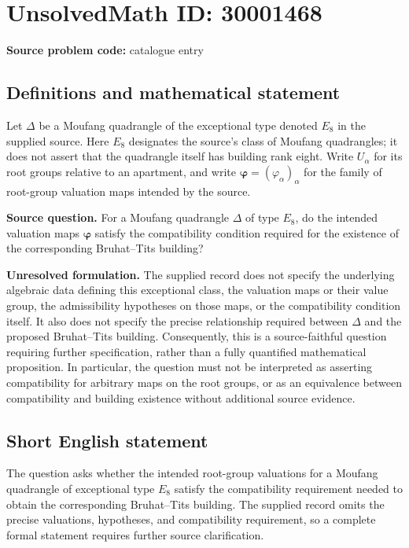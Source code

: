 \documentclass[11pt]{article}
\begin{document}
\section*{UnsolvedMath ID: 30001468}
\textbf{Source problem code:} catalogue entry
\subsection{Definitions and mathematical statement}
Let \(\Delta\) be a Moufang quadrangle of the exceptional type denoted \(E_8\) in the supplied source. Here \(E_8\) designates the source's class of Moufang quadrangles; it does not assert that the quadrangle itself has building rank eight. Write \(U_\alpha\) for its root groups relative to an apartment, and write \(\boldsymbol\varphi=(\varphi_\alpha)_\alpha\) for the family of root-group valuation maps intended by the source.

\textbf{Source question.} For a Moufang quadrangle \(\Delta\) of type \(E_8\), do the intended valuation maps \(\boldsymbol\varphi\) satisfy the compatibility condition required for the existence of the corresponding Bruhat--Tits building?

\textbf{Unresolved formulation.} The supplied record does not specify the underlying algebraic data defining this exceptional class, the valuation maps or their value group, the admissibility hypotheses on those maps, or the compatibility condition itself. It also does not specify the precise relationship required between \(\Delta\) and the proposed Bruhat--Tits building. Consequently, this is a source-faithful question requiring further specification, rather than a fully quantified mathematical proposition. In particular, the question must not be interpreted as asserting compatibility for arbitrary maps on the root groups, or as an equivalence between compatibility and building existence without additional source evidence.
\subsection{Short English statement}
The question asks whether the intended root-group valuations for a Moufang quadrangle of exceptional type \(E_8\) satisfy the compatibility requirement needed to obtain the corresponding Bruhat--Tits building. The supplied record omits the precise valuations, hypotheses, and compatibility requirement, so a complete formal statement requires further source clarification.
\end{document}
